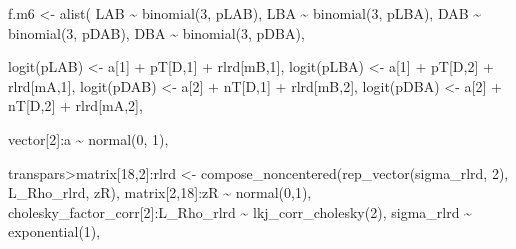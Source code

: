 \documentclass[
]{article}
\newenvironment{Shaded}{\begin{snugshade}}{\end{snugshade}}
\newcommand{\DecValTok}[1]{\textcolor[rgb]{0.00,0.00,0.81}{#1}}
\newcommand{\FunctionTok}[1]{\textcolor[rgb]{0.00,0.00,0.00}{#1}}
\newcommand{\NormalTok}[1]{#1}
\newcommand{\OtherTok}[1]{\textcolor[rgb]{0.56,0.35,0.01}{#1}}
\newcommand{\SpecialCharTok}[1]{\textcolor[rgb]{0.00,0.00,0.00}{#1}}
\begin{document}
\begin{Shaded}
\begin{Highlighting}[]
\NormalTok{f.m6 }\OtherTok{\textless{}{-}} \FunctionTok{alist}\NormalTok{(}
\NormalTok{    LAB }\SpecialCharTok{\textasciitilde{}} \FunctionTok{binomial}\NormalTok{(}\DecValTok{3}\NormalTok{, pLAB),}
\NormalTok{    LBA }\SpecialCharTok{\textasciitilde{}} \FunctionTok{binomial}\NormalTok{(}\DecValTok{3}\NormalTok{, pLBA),}
\NormalTok{    DAB }\SpecialCharTok{\textasciitilde{}} \FunctionTok{binomial}\NormalTok{(}\DecValTok{3}\NormalTok{, pDAB),}
\NormalTok{    DBA }\SpecialCharTok{\textasciitilde{}} \FunctionTok{binomial}\NormalTok{(}\DecValTok{3}\NormalTok{, pDBA),}

    \FunctionTok{logit}\NormalTok{(pLAB) }\OtherTok{\textless{}{-}}\NormalTok{ a[}\DecValTok{1}\NormalTok{] }\SpecialCharTok{+}\NormalTok{ pT[D,}\DecValTok{1}\NormalTok{] }\SpecialCharTok{+}\NormalTok{ rlrd[mB,}\DecValTok{1}\NormalTok{],}
    \FunctionTok{logit}\NormalTok{(pLBA) }\OtherTok{\textless{}{-}}\NormalTok{ a[}\DecValTok{1}\NormalTok{] }\SpecialCharTok{+}\NormalTok{ pT[D,}\DecValTok{2}\NormalTok{] }\SpecialCharTok{+}\NormalTok{ rlrd[mA,}\DecValTok{1}\NormalTok{],}
    \FunctionTok{logit}\NormalTok{(pDAB) }\OtherTok{\textless{}{-}}\NormalTok{ a[}\DecValTok{2}\NormalTok{] }\SpecialCharTok{+}\NormalTok{ nT[D,}\DecValTok{1}\NormalTok{] }\SpecialCharTok{+}\NormalTok{ rlrd[mB,}\DecValTok{2}\NormalTok{],}
    \FunctionTok{logit}\NormalTok{(pDBA) }\OtherTok{\textless{}{-}}\NormalTok{ a[}\DecValTok{2}\NormalTok{] }\SpecialCharTok{+}\NormalTok{ nT[D,}\DecValTok{2}\NormalTok{] }\SpecialCharTok{+}\NormalTok{ rlrd[mA,}\DecValTok{2}\NormalTok{],}

\NormalTok{    vector[}\DecValTok{2}\NormalTok{]}\SpecialCharTok{:}\NormalTok{a }\SpecialCharTok{\textasciitilde{}} \FunctionTok{normal}\NormalTok{(}\DecValTok{0}\NormalTok{, }\DecValTok{1}\NormalTok{),}

\NormalTok{    transpars}\SpecialCharTok{\textgreater{}}\NormalTok{matrix[}\DecValTok{18}\NormalTok{,}\DecValTok{2}\NormalTok{]}\SpecialCharTok{:}\NormalTok{rlrd }\OtherTok{\textless{}{-}} 
        \FunctionTok{compose\_noncentered}\NormalTok{(}\FunctionTok{rep\_vector}\NormalTok{(sigma\_rlrd, }\DecValTok{2}\NormalTok{), L\_Rho\_rlrd, zR),}
\NormalTok{    matrix[}\DecValTok{2}\NormalTok{,}\DecValTok{18}\NormalTok{]}\SpecialCharTok{:}\NormalTok{zR }\SpecialCharTok{\textasciitilde{}} \FunctionTok{normal}\NormalTok{(}\DecValTok{0}\NormalTok{,}\DecValTok{1}\NormalTok{),}
\NormalTok{    cholesky\_factor\_corr[}\DecValTok{2}\NormalTok{]}\SpecialCharTok{:}\NormalTok{L\_Rho\_rlrd }\SpecialCharTok{\textasciitilde{}} \FunctionTok{lkj\_corr\_cholesky}\NormalTok{(}\DecValTok{2}\NormalTok{),}
\NormalTok{    sigma\_rlrd }\SpecialCharTok{\textasciitilde{}} \FunctionTok{exponential}\NormalTok{(}\DecValTok{1}\NormalTok{),}


\end{Highlighting}
\end{Shaded}
\end{document}
